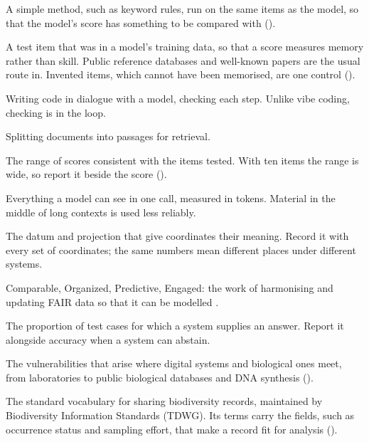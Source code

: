 \begin{description}[itemsep=0.2em]
\item[Baseline] A simple method, such as keyword rules, run on the same items
  as the model, so that the model's score has something to be compared with
  ().

\item[Benchmark contamination] A test item that was in a model's training
  data, so that a score measures memory rather than skill. Public reference
  databases and well-known papers are the usual route in. Invented items,
  which cannot have been memorised, are one control ().

\item[CHOP (Chat-Oriented Programming)] Writing code in dialogue with a model,
  checking each step. Unlike vibe coding, checking is in the loop.

\item[Chunking] Splitting documents into passages for retrieval.

\item[Confidence interval] The range of scores consistent with the items
  tested. With ten items the range is wide, so report it beside the score
  ().

\item[Context window] Everything a model can see in one call, measured in
  tokens. Material in the middle of long contexts is used less reliably.

\item[Coordinate reference system (CRS)] The datum and projection that give
  coordinates their meaning. Record it with every set of coordinates; the same
  numbers mean different places under different systems.

\item[COPE] Comparable, Organized, Predictive, Engaged: the work of harmonising
  and updating FAIR data so that it can be modelled
  \parencite{woodcharlson2026cope}.

\item[Coverage] The proportion of test cases for which a system supplies an
  answer. Report it alongside accuracy when a system can abstain.

\item[Cyberbiosecurity] The vulnerabilities that arise where digital systems
  and biological ones meet, from laboratories to public biological databases
  and DNA synthesis \parencite{ranjan2025cyberbiosecurity}
  ().

\item[Darwin Core] The standard vocabulary for sharing biodiversity records,
  maintained by Biodiversity Information Standards (TDWG). Its terms carry the
  fields, such as occurrence status and sampling effort, that make a record
  fit for analysis \parencite{wieczorek2012darwincore} ().


\end{description}
